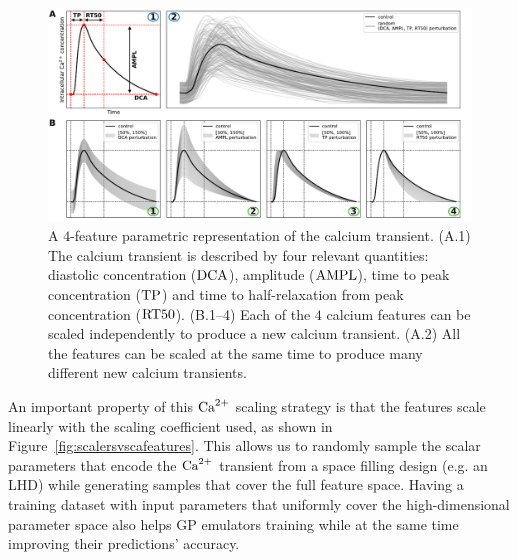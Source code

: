 \begin{figure}[ht!]
    \myfloatalign
    \includegraphics[width=\textwidth]{figures/chapter06/ca_biomarkers_and_scaling_explained_with_labels.pdf}
    \caption{A $4$-feature parametric representation of the calcium transient. (A.1) The calcium transient is described by four relevant quantities: diastolic concentration ($\textrm{DCA}$), amplitude ($\textrm{AMPL}$), time to peak concentration ($\textrm{TP}$) and time to half-relaxation from peak concentration ($\textrm{RT50}$). (B.1--4) Each of the $4$ calcium features can be scaled independently to produce a new calcium transient. (A.2) All the features can be scaled at the same time to produce many different new calcium transients.}
    \label{fig:algintopractice}
\end{figure}

\vspace{0.2cm}
An important property of this $\textrm{Ca}^{2+}$ scaling strategy is that the features scale linearly with the scaling coefficient used, as shown in Figure~\ref{fig:scalersvscafeatures}. This allows us to randomly sample the scalar parameters that encode the $\textrm{Ca}^{2+}$ transient from a space filling design (e.g. an LHD) while generating samples that cover the full feature space. Having a training dataset with input parameters that uniformly cover the high-dimensional parameter space also helps GP emulators training while at the same time improving their predictions' accuracy.

